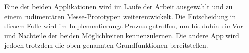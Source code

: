 Eine der beiden Applikationen wird im Laufe der Arbeit ausgewählt und zu einem rudimentären Messe-Prototypen weiterentwickelt. Die Entscheidung in diesem Falle wird im Implementierungs-Prozess getroffen, um bis dahin die Vor- und Nachteile der beiden Möglichkeiten kennenzulernen. Die andere App wird jedoch trotzdem die oben genannten Grundfunktionen bereitstellen.